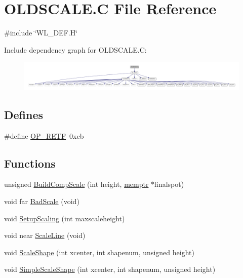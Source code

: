 \hypertarget{OLDSCALE_8C}{
\section{OLDSCALE.C File Reference}
\label{OLDSCALE_8C}
}
{\ttfamily \#include \char`\"{}WL\_\-DEF.H\char`\"{}}\par
Include dependency graph for OLDSCALE.C:
\nopagebreak
\begin{figure}[H]
\begin{center}
\leavevmode
\includegraphics[width=400pt]{OLDSCALE_8C__incl}
\end{center}
\end{figure}
\subsection*{Defines}
\begin{DoxyCompactItemize}
\item 
\#define \hyperlink{OLDSCALE_8C_ac074f674fb85687a1a619fffb702967b}{OP\_\-RETF}~0xcb
\end{DoxyCompactItemize}
\subsection*{Functions}
\begin{DoxyCompactItemize}
\item 
unsigned \hyperlink{OLDSCALE_8C_a3cccf90eaebbbbcd63aeabcbb3e7d8d5}{BuildCompScale} (int height, \hyperlink{ID__MM_8H_a04062decc7eb282b066c65e9137bb9bf}{memptr} $\ast$finalspot)
\item 
void far \hyperlink{OLDSCALE_8C_a1d7dcb4682fb94ac602a78018af0b729}{BadScale} (void)
\item 
void \hyperlink{OLDSCALE_8C_a4604aaa0f82797a8a88e59394a3bef9e}{SetupScaling} (int maxscaleheight)
\item 
void near \hyperlink{OLDSCALE_8C_a9880cdbf8e6e563356f0c5e27b038136}{ScaleLine} (void)
\item 
void \hyperlink{OLDSCALE_8C_ac4e07b4cd66c3fa71e9f675325f5e8ca}{ScaleShape} (int xcenter, int shapenum, unsigned height)
\item 
void \hyperlink{OLDSCALE_8C_a11d04052928f61aec9102f6cce71fadb}{SimpleScaleShape} (int xcenter, int shapenum, unsigned height)
\end{DoxyCompactItemize}
